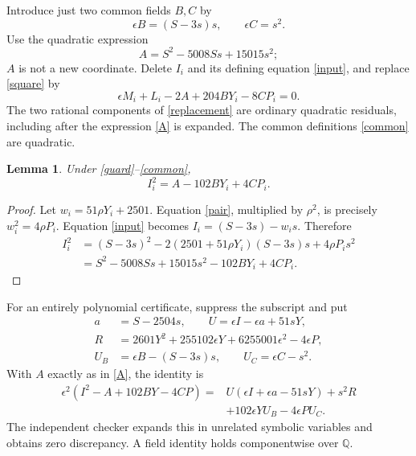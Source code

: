 \documentclass[11pt]{article}
\newtheorem{lemma}[theorem]{Lemma}
\newcommand{\Q}{\mathbb Q}
\begin{document}
Introduce just two common fields $B,C$ by
\begin{equation}\label{common}
              \epsilon B=(S-3s)s,\qquad \epsilon C=s^2.
\end{equation}
Use the quadratic expression
\begin{equation}\label{A}
                         A=S^2-5008Ss+15015s^2;
\end{equation}
$A$ is not a new coordinate. Delete $I_i$ and its defining equation
\eqref{input}, and replace \eqref{square} by
\begin{equation}\label{replacement}
           \epsilon M_i+L_i-2A+204BY_i-8CP_i=0.
\end{equation}
The two rational components of \eqref{replacement} are ordinary
quadratic residuals, including after the expression \eqref{A}
is expanded. The common definitions \eqref{common} are quadratic.

\begin{lemma}\label{identity}
Under \eqref{guard}--\eqref{common},
\begin{equation}\label{evaluation}
                          I_i^2=A-102BY_i+4CP_i.
\end{equation}
\end{lemma}
\begin{proof}
Let $w_i=51\rho Y_i+2501$. Equation \eqref{pair}, multiplied
by $\rho^2$, is precisely $w_i^2=4\rho P_i$.
Equation \eqref{input} becomes $I_i=(S-3s)-w_i s$. Therefore
\begin{align*}
 I_i^2
  &=(S-3s)^2-2(2501+51\rho Y_i)(S-3s)s+4\rho P_i s^2\\
  &=S^2-5008Ss+15015s^2-102BY_i+4CP_i.
\end{align*}
\end{proof}

For an entirely polynomial certificate, suppress the subscript and
put
\[
\begin{aligned}
 a&=S-2504s,\qquad U=\epsilon I-\epsilon a+51sY,\\
 R&=2601Y^2+255102\epsilon Y+6255001\epsilon^2-4\epsilon P,\\
 U_B&=\epsilon B-(S-3s)s,\qquad U_C=\epsilon C-s^2.
\end{aligned}
\]
With $A$ exactly as in \eqref{A}, the identity is
\begin{equation}\label{polynomial}
\begin{split}
 \epsilon^2(I^2-A+102BY-4CP)
   ={}&U(\epsilon I+\epsilon a-51sY)+s^2R\\
     &+102\epsilon YU_B-4\epsilon PU_C.
\end{split}
\end{equation}
The independent checker expands this in unrelated symbolic
variables and obtains zero discrepancy. A field identity holds
componentwise over $\Q$.
\end{document}
